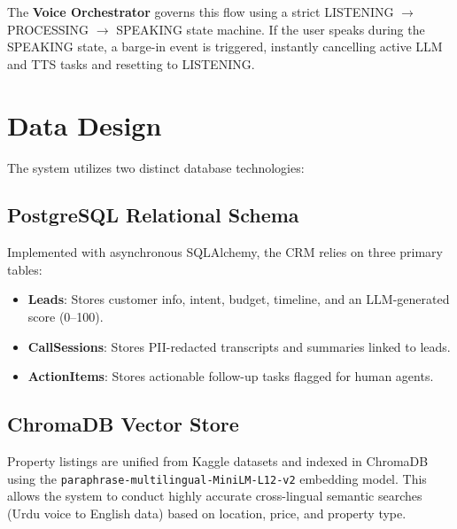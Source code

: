 The \textbf{Voice Orchestrator} governs this flow using a strict LISTENING $\rightarrow$ PROCESSING $\rightarrow$ SPEAKING state machine. If the user speaks during the SPEAKING state, a barge-in event is triggered, instantly cancelling active LLM and TTS tasks and resetting to LISTENING.

\section{Data Design}

The system utilizes two distinct database technologies:

\subsection{PostgreSQL Relational Schema}
Implemented with asynchronous SQLAlchemy, the CRM relies on three primary tables:
\begin{itemize}
    \item \textbf{Leads}: Stores customer info, intent, budget, timeline, and an LLM-generated score (0--100).
    \item \textbf{CallSessions}: Stores PII-redacted transcripts and summaries linked to leads.
    \item \textbf{ActionItems}: Stores actionable follow-up tasks flagged for human agents.
\end{itemize}

\subsection{ChromaDB Vector Store}
Property listings are unified from Kaggle datasets and indexed in ChromaDB using the \texttt{paraphrase-multilingual-MiniLM-L12-v2} embedding model. This allows the system to conduct highly accurate cross-lingual semantic searches (Urdu voice to English data) based on location, price, and property type.
